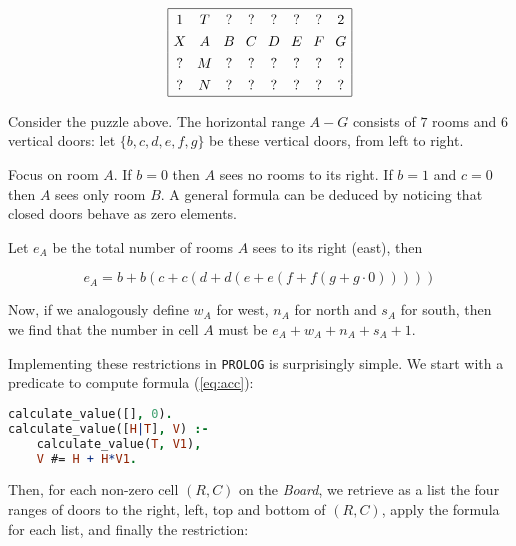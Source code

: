 \documentclass[runningheads]{llncs}
\newcommand*{\cc}[2]{\multicolumn{1}{#1}{#2}}
\begin{document}
\begin{equation*}
\arraycolsep=4.0pt\def\arraystretch{1.3}
\begin{array}[c]{|c c c c c c c c|}
\hline
1 & \cc{ c }{T} & \cc{ c }{?} & \cc{ c }{?} & \cc{ c }{?} & \cc{ c }{?} & \cc{ c }{?} & 2\\
%
X & \cc{ c }{A} & \cc{ c }{B} & \cc{ c }{C} & \cc{ c }{D} & \cc{ c }{E} & \cc{ c }{F} & G\\
%
? & \cc{ c }{M} & \cc{ c }{?} & \cc{ c }{?} & \cc{ c }{?} & \cc{ c }{?} & \cc{ c }{?} & ?\\
%
? & \cc{ c }{N} & \cc{ c }{?} & \cc{ c }{?} & \cc{ c }{?} & \cc{ c }{?} & \cc{ c }{?} & ?\\
\hline
\end{array}
\end{equation*}

Consider the puzzle above. The horizontal range $A-G$ consists of $7$ rooms and $6$ vertical doors: let $\{b,c,d,e,f,g\}$ be these vertical doors, from left to right.

Focus on room $A$.
If $b=0$ then $A$ sees no rooms to its right. If $b=1$ and $c=0$ then $A$ sees only room $B$.
A general formula can be deduced by noticing that closed doors behave as zero elements.

Let $e_A$ be the total number of rooms $A$ sees to its right (east), then

\begin{equation}\label{eq:acc}
e_A=b+b(c+c(d+d(e+e(f+f(g+g\cdot 0)))))
\end{equation}

Now, if we analogously define $w_A$ for west, $n_A$ for north and $s_A$ for south, then we find that the number in cell $A$ must be $e_A+w_A+n_A+s_A+1$.

Implementing these restrictions in \texttt{PROLOG} is surprisingly simple. We start with a predicate to compute formula (\ref{eq:acc}):

\begin{center}
\begin{minipage}{0.45\textwidth}
\centering\ttfamily
\begin{lstlisting}[language=Prolog]
calculate_value([], 0).
calculate_value([H|T], V) :-
    calculate_value(T, V1),
    V #= H + H*V1.
\end{lstlisting}
\end{minipage}
\end{center}

Then, for each non-zero cell $(R,C)$ on the \textsl{Board}, we retrieve as a list the four ranges of doors to the right, left, top and bottom of $(R,C)$, apply the formula for each list, and finally the restriction:
\end{document}
